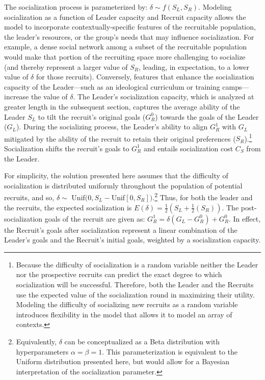 The socialization process is parameterized by: $\delta \sim f(S_{L}, S_{R})$. Modeling socialization as a function of Leader capacity and Recruit capacity allows the model to incorporate contextually-specific features of the recruitable population, the leader's resources, or the group's needs that may influence socialization. For example, a dense social network among a subset of the recruitable population would make that portion of the recruiting space more challenging to socialize (and thereby represent a larger value of $S_{R}$, leading, in expectation, to a lower value of $\delta$ for those recruits). Conversely, features that enhance the socialization capacity of the Leader---such as an ideological curriculum or training camps---increase the value of $\delta$. The Leader's socialization capacity, which is analyzed at greater length in the subsequent section, captures the average ability of the Leader $S_{L}$ to tilt the recruit's original goals ($G^{0}_{R}$) towards the goals of the Leader ($G_{L}$).  During the socializing process, the Leader's ability to align $G^{1}_{R}$ with $G_{L} $ mitigated by the ability of the recruit to retain their original preferences ($S_{R}$).\footnote{Because the difficulty of socialization is a random variable neither the Leader nor the prospective recruits can predict the exact degree to which socialization will be successful. Therefore, both the Leader and the Recruits use the expected value of the socialization round in maximizing their utility.  Modeling the difficulty of socializing new recruits as a random variable introduces flexibility in the model that allows it to model an array of contexts.} Socialization shifts the recruit's goals to $G^{1}_{R}$ and entails socialization cost $C_{S}$ from the Leader. 
 
For simplicity, the solution presented here assumes that the difficulty of socialization is distributed uniformly throughout the population of potential recruits, and so, $\delta \sim$ Unif$(0, S_{L}- $Unif$[0, S_ {R}])$.\footnote{Equivalently, $\delta$ can be conceptualized as a Beta distribution with hyperparameters $\alpha = \beta = 1$. This parameterization is equivalent to the Uniform distribution presented here, but would allow for a Bayesian interpretation of the socialization parameter.} Thus, for both the leader and the recruits, the expected socialization is $E(\delta) = \frac{1}{2}(S_{L} + \frac{1}{2}(S_{R}))$.  The post-socialization goals of the recruit are given as: $G^{1}_{R} = \delta(G_{L}-G^{0}_{R})+ G^{0}_{R}$. In effect, the Recruit's goals after socialization represent a linear combination of the Leader's goals and the Recruit's initial goals, weighted by a socialization capacity.

